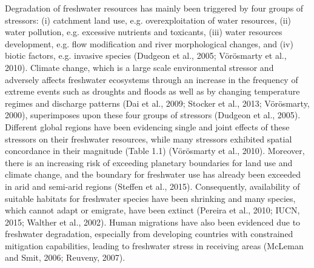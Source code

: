 Degradation of freshwater resources has mainly been triggered by four groups of stressors: (i) catchment land use, e.g. overexploitation of water resources, (ii) water pollution, e.g. excessive nutrients and toxicants, (iii) water resources development, e.g. flow modification and river morphological changes, and (iv) biotic factors, e.g. invasive species (Dudgeon et al., 2005; Vörösmarty et al., 2010).  Climate change, which is a large scale environmental stressor and adversely affects freshwater ecosystems through an increase in the frequency of extreme events such as droughts and floods as well as by changing temperature regimes and discharge patterns (Dai et al., 2009; Stocker et al., 2013; Vörösmarty, 2000), superimposes upon these four groups of stressors (Dudgeon et al., 2005). Different global regions have been evidencing single and joint effects of these stressors on their freshwater resources, while many stressors exhibited spatial concordance in their magnitude (Table 1.1) (Vörösmarty et al., 2010). Moreover, there is an increasing risk of exceeding planetary boundaries for land use and climate change, and the boundary for freshwater use has already been exceeded in arid and semi-arid regions (Steffen et al., 2015). Consequently, availability of suitable habitats for freshwater species have been shrinking and many species, which cannot adapt or emigrate, have been extinct (Pereira et al., 2010; IUCN, 2015; Walther et al., 2002). Human migrations have also been evidenced due to freshwater degradation, especially from developing countries with constrained mitigation capabilities, leading to freshwater stress in receiving areas (McLeman and Smit, 2006; Reuveny, 2007).

